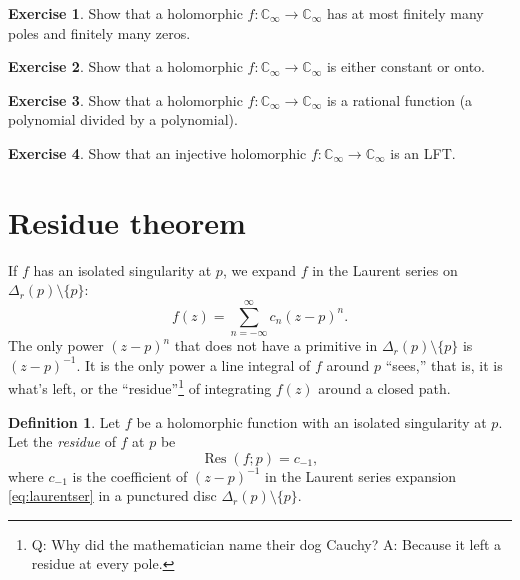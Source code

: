 \documentclass[12pt,openany]{book}
\newcommand{\C}{{\mathbb{C}}}
\newcommand{\myindex}[1]{#1\index{#1}}
\newcommand{\myquote}[1]{``#1''}
\theoremstyle{plain}
\theoremstyle{remark}
\theoremstyle{definition}
\newtheorem{defn}[thm]{Definition}
\newenvironment{exbox}{%
    \def\FrameCommand{\vrule width 1pt \relax\hspace{10pt}}%
    \MakeFramed{\advance\hsize-\width\FrameRestore}%
}{%
    \endMakeFramed
}
\theoremstyle{exercise}
\newtheorem{exercise}{Exercise}[section]
\theoremstyle{example}
\begin{document}
\begin{exbox}
\begin{exercise}
Show that a holomorphic $f \colon \C_\infty \to \C_\infty$ has
at most finitely many poles and finitely many zeros.
\end{exercise}

\begin{exercise}
Show that a holomorphic $f \colon \C_\infty \to \C_\infty$ is
either constant or onto.
\end{exercise}

\begin{exercise}
Show that a holomorphic $f \colon \C_\infty \to \C_\infty$ is a
rational function (a polynomial divided by a polynomial).
\end{exercise}

\begin{exercise}
Show that an injective holomorphic $f \colon \C_\infty \to \C_\infty$ is an LFT.
\end{exercise}
\end{exbox}


\section{Residue theorem}

If $f$ has an isolated singularity at $p$,
we expand
$f$ in the Laurent series on $\Delta_r(p) \setminus \{ p \}$:
\begin{equation} \label{eq:laurentser}
f(z) = \sum_{n=-\infty}^\infty c_n {(z-p)}^n .
\end{equation}
The only power ${(z-p)}^n$ that does not have a primitive in
$\Delta_r(p) \setminus \{ p \}$ is ${(z-p)}^{-1}$.  It is the only power
a line integral of $f$ around $p$ \myquote{sees,} that is, it is
what's left, or the \myquote{residue}\footnote{%
Q: Why did the mathematician name their dog Cauchy?
A: Because it left a residue at every pole.}
of integrating $f(z)$ around a closed path.

\begin{defn}
Let $f$ be a holomorphic function
with an isolated singularity at $p$.
Let the \emph{\myindex{residue}} of $f$ at $p$ be
%
\begin{equation*}
\operatorname{Res}(f;p) = c_{-1} ,
\end{equation*}
where $c_{-1}$ is the coefficient of ${(z-p)}^{-1}$ in the Laurent series
expansion \eqref{eq:laurentser} in a punctured disc $\Delta_r(p) \setminus \{ p \}$.
\end{defn}
\end{document}
